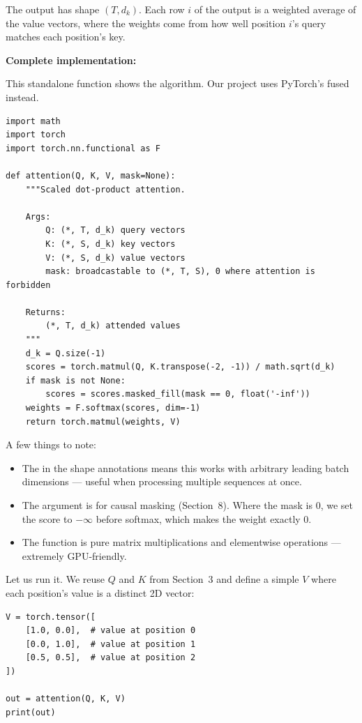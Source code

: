 The output has shape $(T, d_k)$. Each row $i$ of the output is a weighted average of the value vectors, where the weights come from how well position $i$'s query matches each position's key.

\textbf{Complete implementation:}

This standalone function shows the algorithm. Our project uses PyTorch's fused  instead.

\demotag
\begin{lstlisting}
import math
import torch
import torch.nn.functional as F

def attention(Q, K, V, mask=None):
    """Scaled dot-product attention.

    Args:
        Q: (*, T, d_k) query vectors
        K: (*, S, d_k) key vectors
        V: (*, S, d_k) value vectors
        mask: broadcastable to (*, T, S), 0 where attention is forbidden

    Returns:
        (*, T, d_k) attended values
    """
    d_k = Q.size(-1)
    scores = torch.matmul(Q, K.transpose(-2, -1)) / math.sqrt(d_k)
    if mask is not None:
        scores = scores.masked_fill(mask == 0, float('-inf'))
    weights = F.softmax(scores, dim=-1)
    return torch.matmul(weights, V)
\end{lstlisting}

A few things to note:
\begin{itemize}
  \item The \code{*} in the shape annotations means this works with arbitrary leading batch dimensions --- useful when processing multiple sequences at once.
  \item The  argument is for causal masking (Section~8). Where the mask is 0, we set the score to $-\infty$ before softmax, which makes the weight exactly 0.
  \item The function is pure matrix multiplications and elementwise operations --- extremely GPU-friendly.
\end{itemize}

Let us run it. We reuse $Q$ and $K$ from Section~3 and define a simple $V$ where each position's value is a distinct 2D vector:

\demotag
\begin{lstlisting}
V = torch.tensor([
    [1.0, 0.0],  # value at position 0
    [0.0, 1.0],  # value at position 1
    [0.5, 0.5],  # value at position 2
])

out = attention(Q, K, V)
print(out)
\end{lstlisting}

